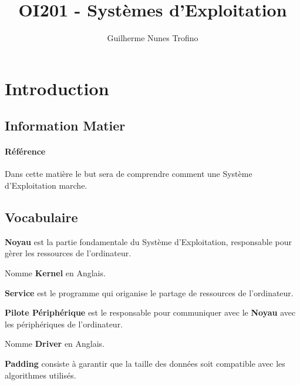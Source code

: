 \documentclass{article}
\title{OI201 - Systèmes d'Exploitation}
\author{Guilherme Nunes Trofino}
\begin{document}
\maketitle


\newpage\tableofcontents

\section{Introduction}

% 
% 


\subsection{Information Matier}
\paragraph{Référence}Dans cette matière le but sera de comprendre comment une Système d'Exploitation marche.

\newpage\subsection{Vocabulaire}
\begin{definition}
    \textbf{Noyau} est la partie fondamentale du Système d'Exploitation, responsable pour gèrer les ressources de l'ordinateur.    
    \begin{remark}
        Nomme \textbf{Kernel} en Anglais.
    \end{remark}
\end{definition}

\begin{definition}
    \textbf{Service} est le programme qui origanise le partage de ressources de l'ordinateur.
\end{definition}

\begin{definition}
    \textbf{Pilote Périphérique} est le responsable pour communiquer avec le \textbf{Noyau} avec les périphériques de l'ordinateur.    
    \begin{remark}
        Nomme \textbf{Driver} en Anglais.
    \end{remark}
\end{definition}

\begin{definition}
    \textbf{Padding} consiste à garantir que la taille des données soit compatible avec les algorithmes utilisés.
\end{definition}
\end{document}
